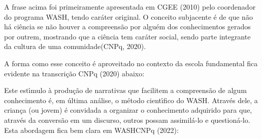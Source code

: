 \documentclass[
12pt,		%
openright,	%
twoside,  %
a4paper,			%
chapter=TITLE,		%
english,			%
french,				%
spanish,			%
brazil				%
]{USPSC-classe/USPSC}
\begin{document}
\noindent\begin{center}\mbox{\centering{}}\end{center}


A frase acima foi primeiramente apresentada em  CGEE (2010) pelo coordenador do programa WASH, tendo car\'ater original. O conceito subjacente \'e de que \textquotedbl n\~ao h\'a ci\^encia se n\~ao houver a compreens\~ao por algu\'em dos conhecimentos gerados por outrem, mostrando que a ci\^encia tem car\'ater social, sendo parte integrante da cultura de uma comunidade\textquotedbl   (CNPq, 2020).










A forma como esse conceito \'e aproveitado no contexto da escola fundamental fica evidente na transcri\c{c}\~ao  CNPq (2020) abaixo:











\noindent\begin{center}\mbox{\centering{}}\end{center}


Este est\'{\i}mulo \`a produ\c{c}\~ao de narrativas que facilitem a compreens\~ao de algum conhecimento \'e, em \'ultima an\'alise, o m\'etodo cient\'{\i}fico do WASH. Atrav\'es dele, a crian\c{c}a (ou jovem) \'e convidada a organizar o conhecimento adquirido para que, atrav\'es da convers\~ao em um discurso, outros possam assimil\'a-lo e question\'a-lo. Esta abordagem fica bem clara em  WASHCNPq (2022):
\end{document}
